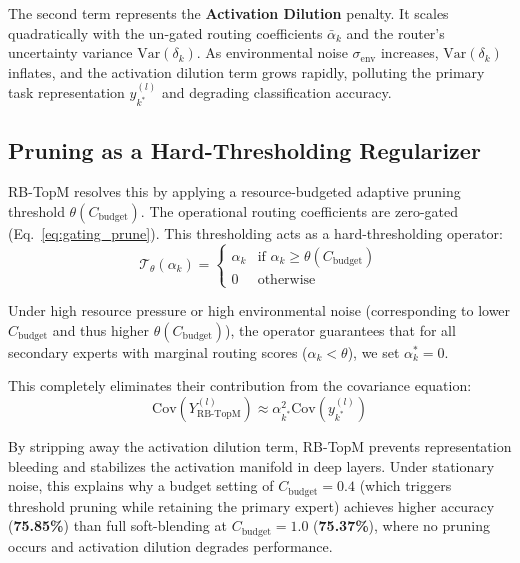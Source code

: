 \documentclass{article}
\theoremstyle{plain}
\theoremstyle{definition}
\theoremstyle{remark}
\begin{document}
The second term represents the \textbf{Activation Dilution} penalty. It scales quadratically with the un-gated routing coefficients $\bar{\alpha}_k$ and the router's uncertainty variance $\text{Var}(\delta_k)$. As environmental noise $\sigma_{\text{env}}$ increases, $\text{Var}(\delta_k)$ inflates, and the activation dilution term grows rapidly, polluting the primary task representation $y_{k^*}^{(l)}$ and degrading classification accuracy.

\subsection{Pruning as a Hard-Thresholding Regularizer}
RB-TopM resolves this by applying a resource-budgeted adaptive pruning threshold $\theta(C_{\text{budget}})$. The operational routing coefficients are zero-gated (Eq.~\ref{eq:gating_prune}). This thresholding acts as a hard-thresholding operator:
\begin{equation}
\mathcal{T}_{\theta}(\alpha_k) = \begin{cases} \alpha_k & \text{if } \alpha_k \ge \theta(C_{\text{budget}}) \\ 0 & \text{otherwise} \end{cases}
\label{eq:app_threshold}
\end{equation}

Under high resource pressure or high environmental noise (corresponding to lower $C_{\text{budget}}$ and thus higher $\theta(C_{\text{budget}})$), the operator guarantees that for all secondary experts with marginal routing scores ($\alpha_k < \theta$), we set $\alpha^*_{k} = 0$. 

This completely eliminates their contribution from the covariance equation:
\begin{equation}
\text{Cov}\left( Y^{(l)}_{\text{RB-TopM}} \right) \approx \alpha_{k^*}^2 \text{Cov}(y_{k^*}^{(l)})
\label{eq:app_clean_covariance}
\end{equation}

By stripping away the activation dilution term, RB-TopM prevents representation bleeding and stabilizes the activation manifold in deep layers. Under stationary noise, this explains why a budget setting of $C_{\text{budget}} = 0.4$ (which triggers threshold pruning while retaining the primary expert) achieves higher accuracy (\textbf{75.85\%}) than full soft-blending at $C_{\text{budget}} = 1.0$ (\textbf{75.37\%}), where no pruning occurs and activation dilution degrades performance.
\end{document}
